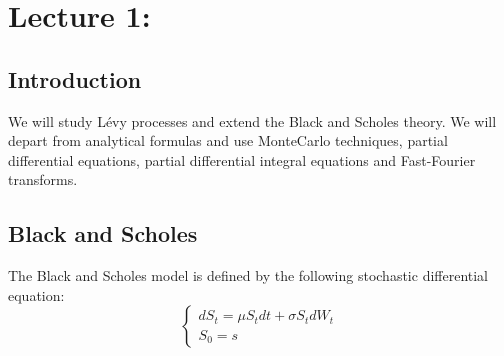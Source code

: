 \chapter{Lecture 1: }

\section{Introduction}
We will study Lévy processes and extend the Black and Scholes theory.
We will depart from analytical formulas and use MonteCarlo techniques, partial
differential equations, partial differential integral equations and Fast-Fourier
transforms.

\section{Black and Scholes}
The Black and Scholes model is defined by the following stochastic differential
equation:
\[
    \left \{
        \begin{array}{l}
            dS_t = \mu S_t dt + \sigma S_t dW_t \\
            S_0 = s 
        \end{array}
    \right .
\]
